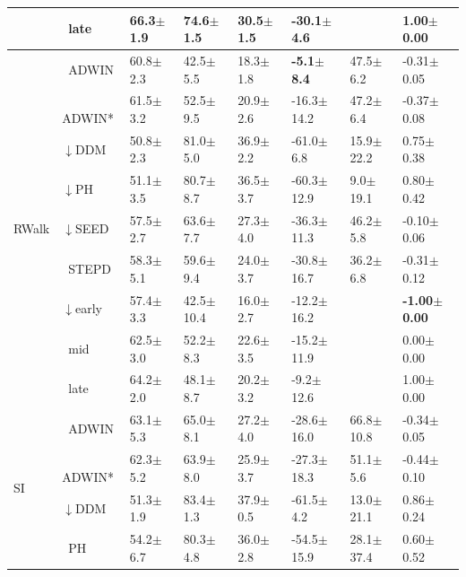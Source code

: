 \begin{tabular}{llllllll}
 & $\ \;$late & 66.3\tiny{$\pm$1.9} & 74.6\tiny{$\pm$1.5} & 30.5\tiny{$\pm$1.5} & -30.1\tiny{$\pm$4.6} &  & 1.00\tiny{$\pm$0.00} \\
\midrule
\multirow[t]{9}{*}{RWalk} & $\ \;$ADWIN & 60.8\tiny{$\pm$2.3} & 42.5\tiny{$\pm$5.5} & 18.3\tiny{$\pm$1.8} & \textbf{-5.1\tiny{$\pm$8.4}} & 47.5\tiny{$\pm$6.2} & -0.31\tiny{$\pm$0.05} \\
 & $\ \;$ADWIN* & 61.5\tiny{$\pm$3.2} & 52.5\tiny{$\pm$9.5} & 20.9\tiny{$\pm$2.6} & -16.3\tiny{$\pm$14.2} & 47.2\tiny{$\pm$6.4} & -0.37\tiny{$\pm$0.08} \\
 & $\downarrow$DDM & 50.8\tiny{$\pm$2.3} & 81.0\tiny{$\pm$5.0} & 36.9\tiny{$\pm$2.2} & -61.0\tiny{$\pm$6.8} & 15.9\tiny{$\pm$22.2} & 0.75\tiny{$\pm$0.38} \\
 & $\downarrow$PH & 51.1\tiny{$\pm$3.5} & 80.7\tiny{$\pm$8.7} & 36.5\tiny{$\pm$3.7} & -60.3\tiny{$\pm$12.9} & 9.0\tiny{$\pm$19.1} & 0.80\tiny{$\pm$0.42} \\
 & $\downarrow$SEED & 57.5\tiny{$\pm$2.7} & 63.6\tiny{$\pm$7.7} & 27.3\tiny{$\pm$4.0} & -36.3\tiny{$\pm$11.3} & 46.2\tiny{$\pm$5.8} & -0.10\tiny{$\pm$0.06} \\
 & $\ \;$STEPD & 58.3\tiny{$\pm$5.1} & 59.6\tiny{$\pm$9.4} & 24.0\tiny{$\pm$3.7} & -30.8\tiny{$\pm$16.7} & 36.2\tiny{$\pm$6.8} & -0.31\tiny{$\pm$0.12} \\
 & $\downarrow$early & 57.4\tiny{$\pm$3.3} & 42.5\tiny{$\pm$10.4} & 16.0\tiny{$\pm$2.7} & -12.2\tiny{$\pm$16.2} &  & \textbf{-1.00\tiny{$\pm$0.00}} \\
 & $\ \;$mid & 62.5\tiny{$\pm$3.0} & 52.2\tiny{$\pm$8.3} & 22.6\tiny{$\pm$3.5} & -15.2\tiny{$\pm$11.9} &  & 0.00\tiny{$\pm$0.00} \\
 & $\ \;$late & 64.2\tiny{$\pm$2.0} & 48.1\tiny{$\pm$8.7} & 20.2\tiny{$\pm$3.2} & -9.2\tiny{$\pm$12.6} &  & 1.00\tiny{$\pm$0.00} \\
\midrule
\multirow[t]{9}{*}{SI} & $\ \;$ADWIN & 63.1\tiny{$\pm$5.3} & 65.0\tiny{$\pm$8.1} & 27.2\tiny{$\pm$4.0} & -28.6\tiny{$\pm$16.0} & 66.8\tiny{$\pm$10.8} & -0.34\tiny{$\pm$0.05} \\
 & $\ \;$ADWIN* & 62.3\tiny{$\pm$5.2} & 63.9\tiny{$\pm$8.0} & 25.9\tiny{$\pm$3.7} & -27.3\tiny{$\pm$18.3} & 51.1\tiny{$\pm$5.6} & -0.44\tiny{$\pm$0.10} \\
 & $\downarrow$DDM & 51.3\tiny{$\pm$1.9} & 83.4\tiny{$\pm$1.3} & 37.9\tiny{$\pm$0.5} & -61.5\tiny{$\pm$4.2} & 13.0\tiny{$\pm$21.1} & 0.86\tiny{$\pm$0.24} \\
 & $\ \;$PH & 54.2\tiny{$\pm$6.7} & 80.3\tiny{$\pm$4.8} & 36.0\tiny{$\pm$2.8} & -54.5\tiny{$\pm$15.9} & 28.1\tiny{$\pm$37.4} & 0.60\tiny{$\pm$0.52} \\

\end{tabular}
